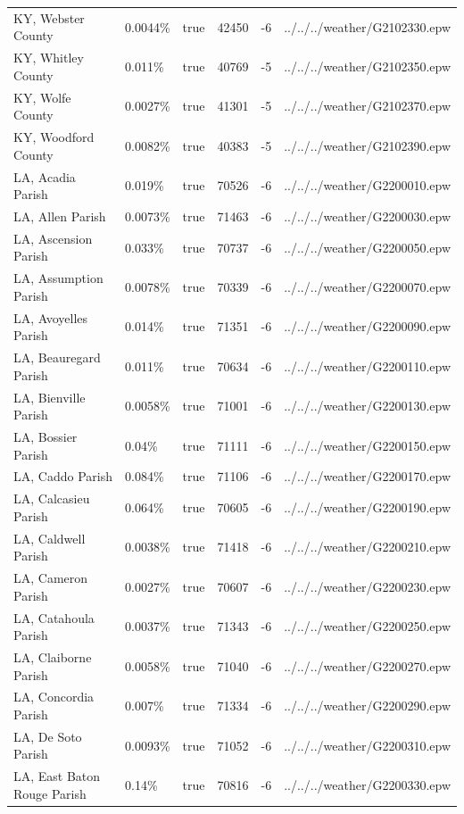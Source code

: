 \begin{longtable}[]{@{}llllll@{}}
KY, Webster County & 0.0044\% & true & 42450 & -6 &
../../../weather/G2102330.epw \\
KY, Whitley County & 0.011\% & true & 40769 & -5 &
../../../weather/G2102350.epw \\
KY, Wolfe County & 0.0027\% & true & 41301 & -5 &
../../../weather/G2102370.epw \\
KY, Woodford County & 0.0082\% & true & 40383 & -5 &
../../../weather/G2102390.epw \\
LA, Acadia Parish & 0.019\% & true & 70526 & -6 &
../../../weather/G2200010.epw \\
LA, Allen Parish & 0.0073\% & true & 71463 & -6 &
../../../weather/G2200030.epw \\
LA, Ascension Parish & 0.033\% & true & 70737 & -6 &
../../../weather/G2200050.epw \\
LA, Assumption Parish & 0.0078\% & true & 70339 & -6 &
../../../weather/G2200070.epw \\
LA, Avoyelles Parish & 0.014\% & true & 71351 & -6 &
../../../weather/G2200090.epw \\
LA, Beauregard Parish & 0.011\% & true & 70634 & -6 &
../../../weather/G2200110.epw \\
LA, Bienville Parish & 0.0058\% & true & 71001 & -6 &
../../../weather/G2200130.epw \\
LA, Bossier Parish & 0.04\% & true & 71111 & -6 &
../../../weather/G2200150.epw \\
LA, Caddo Parish & 0.084\% & true & 71106 & -6 &
../../../weather/G2200170.epw \\
LA, Calcasieu Parish & 0.064\% & true & 70605 & -6 &
../../../weather/G2200190.epw \\
LA, Caldwell Parish & 0.0038\% & true & 71418 & -6 &
../../../weather/G2200210.epw \\
LA, Cameron Parish & 0.0027\% & true & 70607 & -6 &
../../../weather/G2200230.epw \\
LA, Catahoula Parish & 0.0037\% & true & 71343 & -6 &
../../../weather/G2200250.epw \\
LA, Claiborne Parish & 0.0058\% & true & 71040 & -6 &
../../../weather/G2200270.epw \\
LA, Concordia Parish & 0.007\% & true & 71334 & -6 &
../../../weather/G2200290.epw \\
LA, De Soto Parish & 0.0093\% & true & 71052 & -6 &
../../../weather/G2200310.epw \\
LA, East Baton Rouge Parish & 0.14\% & true & 70816 & -6 &
../../../weather/G2200330.epw \\

\end{longtable}
